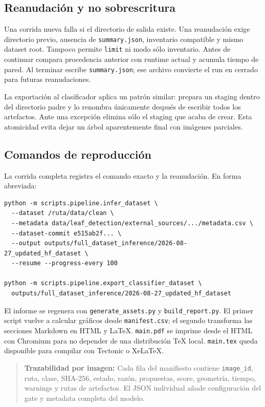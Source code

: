 \documentclass[11pt,a4paper]{article}
\begin{document}
\subsection{Reanudación y no sobrescritura}

Una corrida nueva falla si el directorio de salida existe. Una reanudación exige directorio previo, ausencia de \texttt{summary.json}, inventario compatible y mismo dataset root. Tampoco permite \texttt{limit} ni modo sólo inventario. Antes de continuar compara procedencia anterior con runtime actual y acumula tiempo de pared. Al terminar escribe \texttt{summary.json}; ese archivo convierte el run en cerrado para futuras reanudaciones.


La exportación al clasificador aplica un patrón similar: prepara un staging dentro del directorio padre y lo renombra únicamente después de escribir todos los artefactos. Ante una excepción elimina sólo el staging que acaba de crear. Esta atomicidad evita dejar un árbol aparentemente final con imágenes parciales.


\subsection{Comandos de reproducción}

La corrida completa registra el comando exacto y la reanudación. En forma abreviada:


\begin{verbatim}
python -m scripts.pipeline.infer_dataset \
  --dataset /ruta/data/clean \
  --metadata data/leaf_detection/external_sources/.../metadata.csv \
  --dataset-commit e515ab2f... \
  --output outputs/full_dataset_inference/2026-08-27_updated_hf_dataset \
  --resume --progress-every 100

python -m scripts.pipeline.export_classifier_dataset \
  outputs/full_dataset_inference/2026-08-27_updated_hf_dataset
\end{verbatim}

El informe se regenera con \texttt{generate\_assets.py} y \texttt{build\_report.py}. El primer script vuelve a calcular gráficos desde \texttt{manifest.csv}; el segundo transforma las secciones Markdown en HTML y LaTeX. \texttt{main.pdf} se imprime desde el HTML con Chromium para no depender de una distribución TeX local. \texttt{main.tex} queda disponible para compilar con Tectonic o XeLaTeX.


\begin{quote}\textbf{Trazabilidad por imagen:} Cada fila del manifiesto contiene \texttt{image\_id}, ruta, clase, SHA-256, estado, razón, propuestas, score, geometría, tiempo, warnings y rutas de artefactos. El JSON individual añade configuración del gate y metadata completa del modelo.\end{quote}
\end{document}
